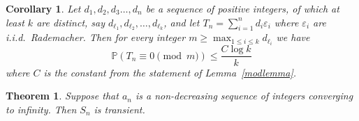 \documentclass[10pt,a4paper]{amsart}
\newtheorem{theorem}{Theorem}
\newtheorem{corollary}{Corollary}
\renewcommand\P{\mathbb{P}}
\newcommand\eps{\varepsilon}
\begin{document}
\begin{corollary}\label{modcor}
Let $d_1,d_2,d_3\dots,d_n$ be a sequence of positive integers, of which at least $k$ are distinct, say $d_{\ell_1},d_{\ell_2},\dots,d_{\ell_k}$, and let $T_n=\sum_{i=1}^n d_i\eps_i$ where  $\eps_i$ are i.i.d.\ Rademacher. Then for every integer $\displaystyle  m\ge \max_{1\le i\le k}d_{\ell_i}$ we have
$$
\P(T_n\equiv 0\pmod m)\le \frac{C \log k}{k}    
$$
where $C$ is the constant from the statement of Lemma~\ref{modlemma}.
\end{corollary}

\begin{theorem}\label{t1}
Suppose that $a_n$ is a non-decreasing sequence of integers converging to infinity. Then $S_n$ is transient.
\end{theorem}
\end{document}
